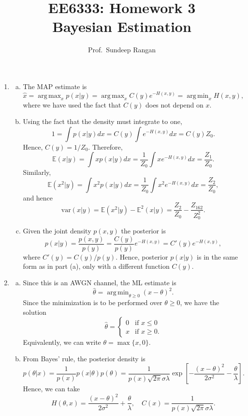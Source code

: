 \documentclass[11pt]{article}
\def\beq{\begin{equation}}
\def\eeq{\end{equation}}
\def\argmin{\mathop{\mathrm{arg\,min}}}
\def\argmax{\mathop{\mathrm{arg\,max}}}
\def\xhat{\widehat{x}}
\def\Exp{\mathbb{E}}
\def\var{\mbox{var}}
\def\thetahat{{\widehat{\theta}}}
\begin{document}
\title{EE6333:  Homework 3\\
Bayesian Estimation}
\author{Prof.\ Sundeep Rangan}
\date{}

\maketitle


\begin{enumerate}

\item 
\begin{enumerate}[(a)]
\item The MAP estimate is
\[
    \xhat = \argmax_x p(x|y) = \argmax_x C(y)e^{-H(x,y)}
    = \argmin_x H(x,y),
\]
where we have used the fact that $C(y)$ does not depend on 
$x$.

\item Using the fact that the density must integrate to one,
\[
    1 = \int p(x|y)dx = C(y)\int e^{-H(x,y)}dx = C(y)Z_0.
\]
Hence, $C(y)=1/Z_0$.  Therefore,
\[
    \Exp(x|y) = \int xp(x|y)dx = \frac{1}{Z_0}
    \int xe^{-H(x,y)}dx = \frac{Z_1}{Z_0}.
\]
Similarly,
\[
    \Exp(x^2|y) = \int x^2p(x|y)dx = \frac{1}{Z_0}
    \int x^2e^{-H(x,y)}dx = \frac{Z_2}{Z_0},
\] 
and hence
\[
    \var(x|y) =\Exp(x^2|y) -\Exp^2(x|y) = 
    \frac{Z_2}{Z_0} - \frac{Z_162}{Z_0^2}.
\]

\item Given the joint density $p(x,y)$ the posterior is 
\[
    p(x|y) = \frac{p(x,y)}{p(y)} = \frac{C(y)}{p(y)}e^{-H(x,y)}
        = C'(y)e^{-H(x,y)},
\]
where $C'(y) = C(y)/p(y)$. Hence, posterior $p(x|y)$ is in the same
form as in part (a), only with a different function $C(y)$.

\end{enumerate}

\item \label{prob:softThresh}
\begin{enumerate}[(a)] 
\item Since this is an AWGN channel, the ML estimate is
\[
    \thetahat = \argmin_{\theta \geq 0} (x-\theta)^2.
\]
Since the minimization is to be performed over $\theta \geq 0$,
we have the solution
\[
    \thetahat =  \begin{cases}
        0  & \mbox{if } x \leq 0 \\
        x  & \mbox{if } x \geq 0.
        \end{cases}
\]
Equivalently, we can write $\theta = \max\{x,0\}$.

\item From Bayes' rule, the posterior density is
\beq \label{eq:pthx}
     p(\theta|x) = \frac{1}{p(x)}p(x|\theta)p(\theta) 
    = \frac{1}{p(x)\sqrt{2\pi}\sigma \lambda}
    \exp\left[ -\frac{(x-\theta)^2}{2\sigma^2} - \frac{\theta}{\lambda} \right].
\eeq
Hence, we can take
\[
    H(\theta,x) = \frac{(x-\theta)^2}{2\sigma^2} 
    + \frac{\theta}{\lambda},
    \quad C(x) = \frac{1}{p(x)\sqrt{2\pi}\sigma \lambda}.
\]


\end{enumerate}
\end{enumerate}
\end{document}
